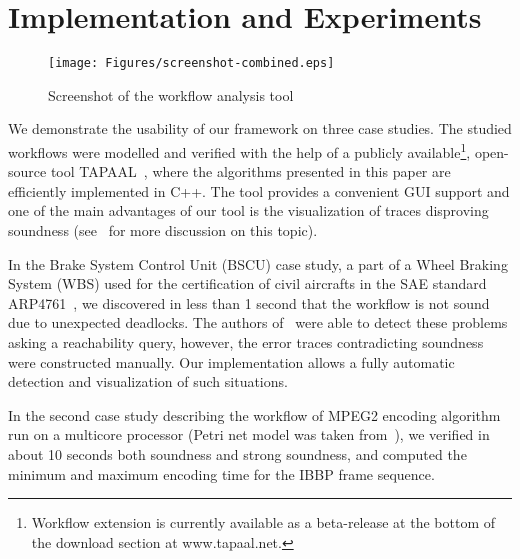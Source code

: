 






\section{Implementation and Experiments}

\begin{figure}[h]
\begin{center}
\texttt{[image: Figures/screenshot-combined.eps]}
\end{center}
\caption{Screenshot of the workflow analysis tool}
\label{fig:screenshot}
\end{figure}


We demonstrate the usability of our framework on three case studies.
The studied workflows were modelled and verified with the help of 
a publicly available\footnote{Workflow extension is currently available 
as a beta-release at the bottom of the download section at www.tapaal.net.},
open-source tool TAPAAL~\cite{DJJJMS:TACAS:12}, where
the algorithms presented in this paper are efficiently implemented
in C++. The tool provides a convenient GUI support and
one of the main advantages of our tool is the visualization of traces
disproving soundness (see~\cite{FF:AWPN:06} for more discussion on 
this topic).

In the Brake System Control Unit (BSCU) case study, a part of a 
Wheel Braking System (WBS) used for the certification of civil aircrafts 
in the SAE standard ARP4761~\cite{SEB:FESCA:13}, we discovered  
in less than 1 second that the workflow is not sound due to 
unexpected deadlocks. The authors of~\cite{SEB:FESCA:13} 
were able to detect these problems asking a reachability query,
however, the error traces contradicting soundness were constructed
manually. Our implementation allows a fully automatic detection and
visualization of such situations.

In the second case study describing the workflow of MPEG2 encoding algorithm
run on a multicore processor (Petri net model was taken 
from~\cite{PCVMP:MMM:04}), we verified in about 10 seconds 
both soundness and strong soundness, and computed 
the minimum and maximum encoding time for the IBBP frame sequence.

